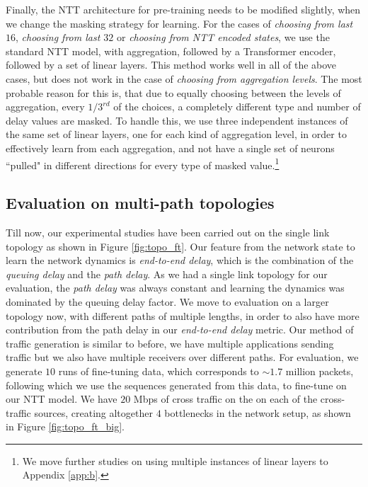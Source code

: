 Finally, the NTT architecture for pre-training needs to be modified slightly, when we change the masking strategy for learning. For the cases of \emph{choosing from last $16$}, \emph{choosing from last $32$} or \emph{choosing from NTT encoded states}, we use the standard NTT model, with aggregation, followed by a Transformer encoder, followed by a set of linear layers. This method works well in all of the above cases, but does not work in the case of \emph{choosing from aggregation levels}. The most probable reason for this is, that due to equally choosing between the levels of aggregation, every $1/3^{rd}$ of the choices, a completely different type and number of delay values are masked. To handle this, we use three independent instances of the same set of linear layers, one for each kind of aggregation level, in order to effectively learn from each aggregation, and not have a single set of neurons ``pulled" in different directions for every type of masked value.\footnote{We move further studies on using multiple instances of linear layers to Appendix \ref{app:b}.}


\subsection{Evaluation on multi-path topologies}
\label{ssec:comptop}

Till now, our experimental studies have been carried out on the single link topology as shown in Figure \ref{fig:topo_ft}. Our feature from the network state to learn the network dynamics is \emph{end-to-end delay}, which is the combination of the \emph{queuing delay} and the \emph{path delay}. As we had a single link topology for our evaluation, the \emph{path delay} was always constant and learning the dynamics was dominated by the queuing delay factor. We move to evaluation on a larger topology now, with different paths of multiple lengths, in order to also have more contribution from the path delay in our \emph{end-to-end delay} metric. Our method of traffic generation is similar to before, we have multiple applications sending traffic but we also have multiple receivers over different paths. For evaluation, we generate $10$ runs of fine-tuning data, which corresponds to ${\sim}1.7$ million packets, following which we use the sequences generated from this data, to fine-tune on our NTT model. We have $20$ Mbps of cross traffic on the on each of the cross-traffic sources, creating altogether $4$ bottlenecks in the network setup, as shown in Figure \ref {fig:topo_ft_big}.

